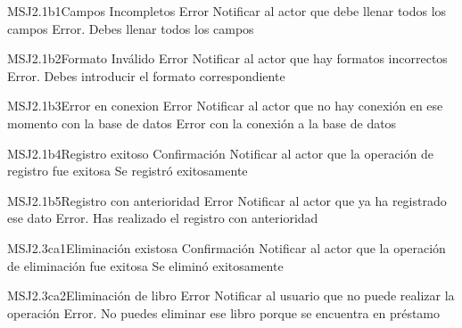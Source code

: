 


\begin{Message}{MSJ2.1b1}{Campos Incompletos}
		\MSGitem[Tipo:] Error	
		\MSGitem[Objetivo: ] Notificar al actor que debe llenar todos los campos
		\MSGitem[Redacción: ] Error. Debes llenar todos los campos
	\end{Message}
	
	\begin{Message}{MSJ2.1b2}{Formato Inválido}
		\MSGitem[Tipo:] Error	
		\MSGitem[Objetivo: ] Notificar al actor que hay formatos incorrectos
		\MSGitem[Redacción: ] Error. Debes introducir el formato correspondiente
	\end{Message}
	
	\begin{Message}{MSJ2.1b3}{Error en conexion}
		\MSGitem[Tipo:] Error	
		\MSGitem[Objetivo: ] Notificar al actor que no hay conexión en ese momento con la base de datos
		\MSGitem[Redacción: ] Error con la conexión a la base de datos
	\end{Message}
	
	\begin{Message}{MSJ2.1b4}{Registro exitoso}
		\MSGitem[Tipo:] Confirmación	
		\MSGitem[Objetivo: ] Notificar al actor que la operación de registro fue exitosa
		\MSGitem[Redacción: ] Se registró exitosamente
	\end{Message}
	
	\begin{Message}{MSJ2.1b5}{Registro con anterioridad}
		\MSGitem[Tipo:] Error	
		\MSGitem[Objetivo: ] Notificar al actor que ya ha registrado ese dato
		\MSGitem[Redacción: ] Error. Has realizado el registro con anterioridad
	\end{Message}
	
	\begin{Message}{MSJ2.3ca1}{Eliminación existosa}
		\MSGitem[Tipo:] Confirmación	
		\MSGitem[Objetivo: ] Notificar al actor que la operación de eliminación fue exitosa
		\MSGitem[Redacción: ] Se eliminó exitosamente
	\end{Message}
	
	\begin{Message}{MSJ2.3ca2}{Eliminación de libro}
		\MSGitem[Tipo:] Error	
		\MSGitem[Objetivo: ] Notificar al usuario que no puede realizar la operación
		\MSGitem[Redacción: ] Error. No puedes eliminar ese libro porque se encuentra en préstamo
	\end{Message}
	
